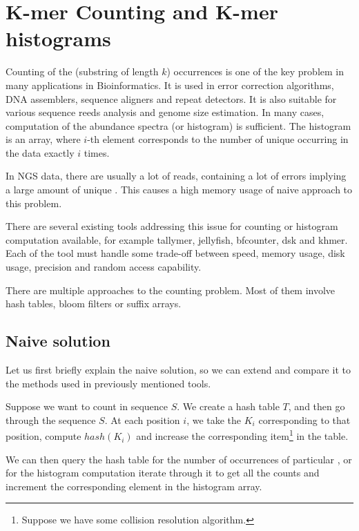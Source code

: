 \chapter{K-mer Counting and K-mer histograms}


Counting of the \kmer(substring of length $k$) occurrences is one of the key problem in many applications in Bioinformatics.
It is used in error correction algorithms, DNA assemblers, sequence aligners and repeat detectors. It is also suitable for various sequence reeds analysis and genome size estimation. In many cases, computation of the \kmer abundance spectra (or \kmer histogram) is sufficient. The \kmer histogram is an array, where $i$-th element corresponds to the number of unique \kmers occurring in the data exactly $i$ times.

In NGS data, there are usually a lot of reads, containing a lot of errors implying a large amount of unique \kmers.
This causes a high memory usage of naive approach to this problem.

There are several existing tools addressing this issue for \kmer counting or \kmer histogram computation available, for example tallymer\cite{tallymer}, jellyfish\cite{jellyfish}, bfcounter\cite{bfcounter}, dsk\cite{dsk} and khmer\cite{khmer}. Each of the tool must handle some trade-off between speed, memory usage, disk usage, precision and random access capability.

There are multiple approaches to the \kmer counting problem. Most of them involve hash tables, bloom filters or suffix arrays.

\section{Naive solution}

Let us first briefly explain the naive solution, so we can extend and compare it to the methods used in previously mentioned tools.

Suppose we want to count \kmers in sequence $S$.
We create a hash table $T$, and then go through the sequence $S$.
At each position $i$, we take the \kmer $K_i$ corresponding to that  position, compute $hash(K_i)$ and increase the corresponding item\footnote{Suppose we have some collision resolution algorithm.} in the table.

We can then query the hash table for the number of occurrences of particular \kmer, or for the histogram computation iterate through it to get all the counts and increment the corresponding element in the histogram array.

